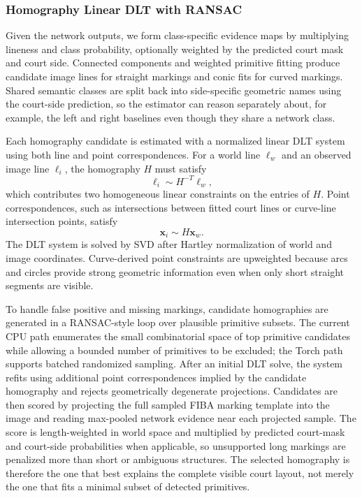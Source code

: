 \subsubsection{Homography Linear DLT with RANSAC}

Given the network outputs, we form class-specific evidence maps by multiplying lineness and class probability, optionally weighted by the predicted court mask and court side.  Connected components and weighted primitive fitting produce candidate image lines for straight markings and conic fits for curved markings.  Shared semantic classes are split back into side-specific geometric names using the court-side prediction, so the estimator can reason separately about, for example, the left and right baselines even though they share a network class.

Each homography candidate is estimated with a normalized linear DLT system using both line and point correspondences.  For a world line $\ell_w$ and an observed image line $\ell_i$, the homography $H$ must satisfy
\[
    \ell_i \sim H^{-T}\ell_w,
\]
which contributes two homogeneous linear constraints on the entries of $H$.  Point correspondences, such as intersections between fitted court lines or curve-line intersection points, satisfy
\[
    \mathbf{x}_i \sim H\mathbf{x}_w.
\]
The DLT system is solved by SVD after Hartley normalization of world and image coordinates.  Curve-derived point constraints are upweighted because arcs and circles provide strong geometric information even when only short straight segments are visible.

To handle false positive and missing markings, candidate homographies are generated in a RANSAC-style loop over plausible primitive subsets.  The current CPU path enumerates the small combinatorial space of top primitive candidates while allowing a bounded number of primitives to be excluded; the Torch path supports batched randomized sampling.  After an initial DLT solve, the system refits using additional point correspondences implied by the candidate homography and rejects geometrically degenerate projections.  Candidates are then scored by projecting the full sampled FIBA marking template into the image and reading max-pooled network evidence near each projected sample.  The score is length-weighted in world space and multiplied by predicted court-mask and court-side probabilities when applicable, so unsupported long markings are penalized more than short or ambiguous structures.  The selected homography is therefore the one that best explains the complete visible court layout, not merely the one that fits a minimal subset of detected primitives.

